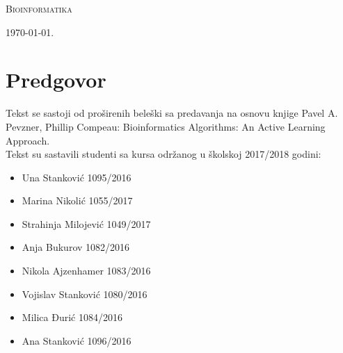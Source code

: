 \documentclass[a4paper]{book}
\begin{document}
\begin{titlepage}
	\vspace*{0.4\textheight}
	
	\begin{center}
		{\Huge \textsc{Bioinformatika}}
	\end{center}
	
	\vfill
	
	\begin{center}
		{\Large \today.}
	\end{center}
\end{titlepage}

\blankpage

\frontmatter
\tableofcontents
\blankpage

\chapter*{Predgovor}
Tekst se sastoji od proširenih beleški sa predavanja na osnovu knjige Pavel A. Pevzner, Phillip Compeau: Bioinformatics Algorithms: An Active Learning Approach. \\Tekst su sastavili studenti sa kursa održanog u školskoj 2017/2018 godini: 
\begin{itemize}
	\item Una Stanković 1095/2016
	\item Marina Nikolić 1055/2017
	\item Strahinja Milojević 1049/2017
	\item Anja Bukurov 1082/2016
	\item Nikola Ajzenhamer 1083/2016
	\item Vojislav Stanković 1080/2016
	\item Milica Đurić 1084/2016
	\item Ana Stanković 1096/2016
\end{itemize}


\blankpage

\mainmatter





\backmatter
\renewcommand{\bibname}{Literatura}

\begingroup
\raggedright

\endgroup


\end{document}
